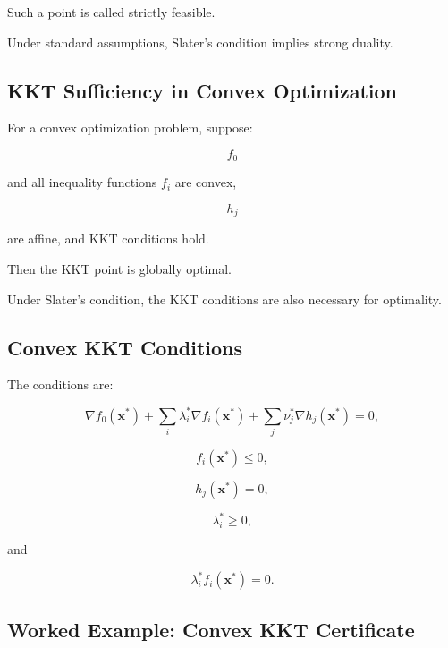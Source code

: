 Such a point is called strictly feasible.

Under standard assumptions, Slater's condition implies strong duality.

\subsection{KKT Sufficiency in Convex Optimization}
\label{subsec:kkt-sufficiency-convex}

For a convex optimization problem, suppose:

\[
f_0
\]

and all inequality functions \(f_i\) are convex,

\[
h_j
\]

are affine, and KKT conditions hold.

Then the KKT point is globally optimal.

Under Slater's condition, the KKT conditions are also necessary for
optimality.

\subsection{Convex KKT Conditions}
\label{subsec:convex-kkt-conditions}

The conditions are:

\[
\boxed{
\nabla f_0(\mathbf{x}^*)
+
\sum_i
\lambda_i^*
\nabla f_i(\mathbf{x}^*)
+
\sum_j
\nu_j^*
\nabla h_j(\mathbf{x}^*)
=
0,
}
\]

\[
\boxed{
f_i(\mathbf{x}^*)\leq0,
}
\]

\[
\boxed{
h_j(\mathbf{x}^*)=0,
}
\]

\[
\boxed{
\lambda_i^*\geq0,
}
\]

and

\[
\boxed{
\lambda_i^*
f_i(\mathbf{x}^*)
=
0.
}
\]

\subsection{Worked Example: Convex KKT Certificate}
\label{subsec:worked-convex-kkt}

